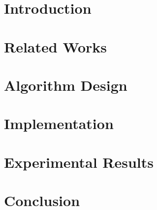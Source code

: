 \documentclass[a4paper,12pt,oneside]{book}
\theoremstyle{definition}
\theoremstyle{definition}
\newcommand\blankpage{%
	\clearpage
	\thispagestyle{plain}
	\null
	\newpage}
\begin{document}
	\frontmatter	{\tiny }
	\mainmatter
		
	\chapter{Introduction}
	\label{cap:chapter1}
	
	
	\chapter{Related Works}
	\label{cap:chapter2}
	
	
	\chapter{Algorithm Design}
	\label{cap:chapter3}
	
	
	\chapter{Implementation}
	\label{cap:chapter4}
	
	
	\chapter{Experimental Results}
	\label{cap:chapter5}
	
	
	\chapter{Conclusion}
	\label{cap:chapter6}
	

	\blankpage
	

	 
	
	
\end{document}
